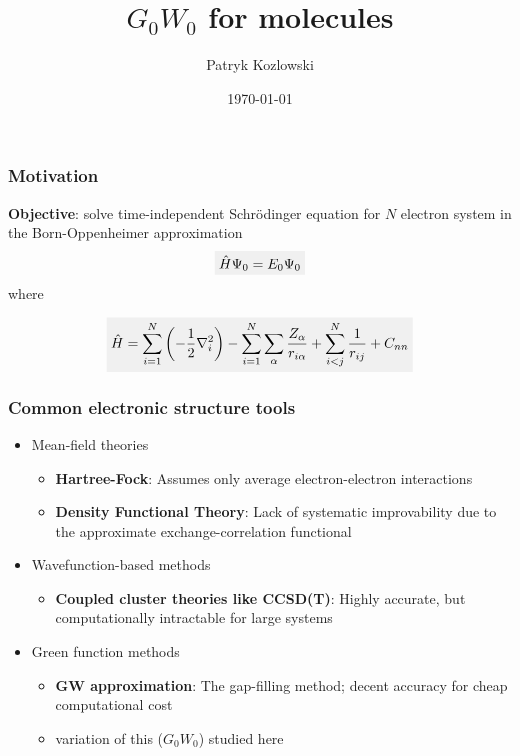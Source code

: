 \documentclass{beamer}
\title{\textcolor{caltechorange}{$G_0W_0$ for molecules}}
\institute{Caltech}
\author{\textcolor{caltechgray}{Patryk Kozlowski}}
\date{\today}
\newcommand{\highlight}[1]{\colorbox{caltechgray!10}{$\displaystyle#1$}}
\begin{document}
\begin{frame}
    \titlepage
\end{frame}
\begin{frame}
    \frametitle{\textcolor{caltechorange}{Motivation}}
\textbf{Objective}: solve time-independent Schrödinger equation for $N$ electron system in the Born-Oppenheimer approximation
\begin{equation}
\highlight{\hat{H}\Psi_0 = E_0\Psi_0}
\end{equation}
\pause
where

\begin{equation}
\highlight{\hat{H} = \sum_{i=1}^N\left(-\frac{1}{2} \nabla_i^2\right) - \sum_{i=1}^N \sum_{\alpha}\frac{Z_{\alpha}}{r_{i\alpha}} + \sum_{i<j}^N \frac{1}{r_{ij}} + C_{nn}}
\end{equation}

\end{frame}

\begin{frame}
    \frametitle{\textcolor{caltechorange}{Common electronic structure tools}}
\begin{itemize}
    \item Mean-field theories
    \begin{itemize}
        \item \textbf{Hartree-Fock}: Assumes only average electron-electron interactions
        \item \textbf{Density Functional Theory}: Lack of systematic improvability due to the approximate exchange-correlation functional
    \end{itemize}
\pause
    \item Wavefunction-based methods
    \begin{itemize}
        \item \textbf{Coupled cluster theories like CCSD(T)}: Highly accurate, but computationally intractable for large systems
        \end{itemize}
\pause
    \item Green function methods
    \begin{itemize}
        \item \textbf{GW approximation}: The gap-filling method; decent accuracy for cheap computational cost
        \item variation of this ($G_0W_0$) studied here
    \end{itemize}
\end{itemize}
\end{frame}
\end{document}
